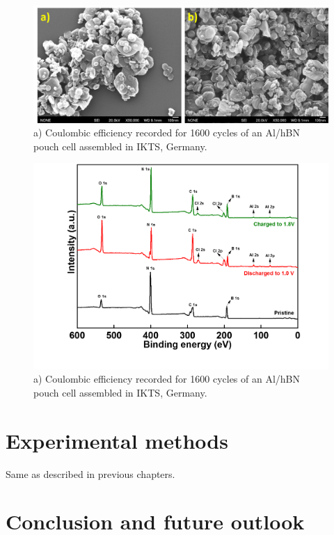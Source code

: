 \begin{figure}[tbh!]
\centering
\includegraphics[width=\textwidth]{Figures/BOhBN/BNNSSEM}
\caption{a) Coulombic efficiency recorded for 1600 cycles of an Al/hBN pouch cell assembled in IKTS, Germany.}
\label{Figures/BOhBN:BNNSSEM}
\end{figure}
\begin{figure}[tbh!]
\centering
\includegraphics[width=\textwidth]{Figures/BOhBN/hBNXPS}
\caption{a) Coulombic efficiency recorded for 1600 cycles of an Al/hBN pouch cell assembled in IKTS, Germany.}
\label{Figures/BOhBN:hBNXPS}
\end{figure}
\section{Experimental methods}
Same as described in previous chapters.
\section{Conclusion and future outlook}
